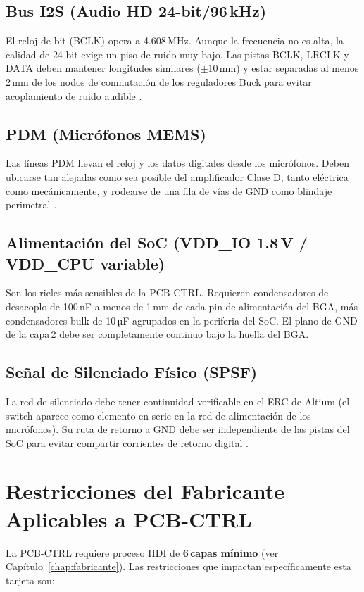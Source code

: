 \subsection{Bus I2S (Audio HD 24-bit/96\,kHz)}
El reloj de bit (BCLK) opera a 4.608\,MHz. Aunque la frecuencia no es alta, la calidad de 24-bit exige un piso de ruido muy bajo. Las pistas BCLK, LRCLK y DATA deben mantener longitudes similares ($\pm$10\,mm) y estar separadas al menos 2\,mm de los nodos de conmutación de los reguladores Buck para evitar acoplamiento de ruido audible .

\subsection{PDM (Micrófonos MEMS)}
Las líneas PDM llevan el reloj y los datos digitales desde los micrófonos. Deben ubicarse tan alejadas como sea posible del amplificador Clase D, tanto eléctrica como mecánicamente, y rodearse de una fila de vías de GND como blindaje perimetral .

\subsection{Alimentación del SoC (VDD\_IO 1.8\,V / VDD\_CPU variable)}
Son los rieles más sensibles de la PCB-CTRL. Requieren condensadores de desacoplo de 100\,nF a menos de 1\,mm de cada pin de alimentación del BGA, más condensadores bulk de 10\,µF agrupados en la periferia del SoC. El plano de GND de la capa\,2 debe ser completamente continuo bajo la huella del BGA.

\subsection{Señal de Silenciado Físico (SPSF)}
La red de silenciado debe tener continuidad verificable en el ERC de Altium (el switch aparece como elemento en serie en la red de alimentación de los micrófonos). Su ruta de retorno a GND debe ser independiente de las pistas del SoC para evitar compartir corrientes de retorno digital .

\section{Restricciones del Fabricante Aplicables a PCB-CTRL}
\label{sec:ctrl_fabricante}

La PCB-CTRL requiere proceso HDI de \textbf{6\,capas mínimo} (ver Capítulo~\ref{chap:fabricante}). Las restricciones que impactan específicamente esta tarjeta son:

